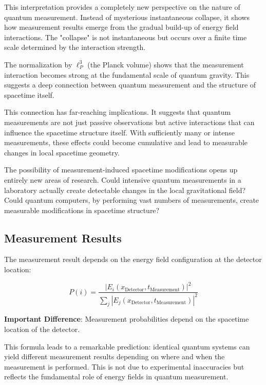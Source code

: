 \documentclass[12pt,a4paper]{article}
\theoremstyle{definition}
\theoremstyle{remark}
\begin{document}
This interpretation provides a completely new perspective on the nature of quantum measurement. Instead of mysterious instantaneous collapse, it shows how measurement results emerge from the gradual build-up of energy field interactions. The "collapse" is not instantaneous but occurs over a finite time scale determined by the interaction strength.

The normalization by $\ell_P^3$ (the Planck volume) shows that the measurement interaction becomes strong at the fundamental scale of quantum gravity. This suggests a deep connection between quantum measurement and the structure of spacetime itself.

This connection has far-reaching implications. It suggests that quantum measurements are not just passive observations but active interactions that can influence the spacetime structure itself. With sufficiently many or intense measurements, these effects could become cumulative and lead to measurable changes in local spacetime geometry.

The possibility of measurement-induced spacetime modifications opens up entirely new areas of research. Could intensive quantum measurements in a laboratory actually create detectable changes in the local gravitational field? Could quantum computers, by performing vast numbers of measurements, create measurable modifications in spacetime structure?

\subsection{Measurement Results}

The measurement result depends on the energy field configuration at the detector location:

\begin{equation}
	P(i) = \frac{|E_i(x_{\text{Detector}}, t_{\text{Measurement}})|^2}{\sum_j |E_j(x_{\text{Detector}}, t_{\text{Measurement}})|^2}
	\label{eq:measurement_probability}
\end{equation}

\textbf{Important Difference}: Measurement probabilities depend on the spacetime location of the detector.

This formula leads to a remarkable prediction: identical quantum systems can yield different measurement results depending on where and when the measurement is performed. This is not due to experimental inaccuracies but reflects the fundamental role of energy fields in quantum measurement.
\end{document}
